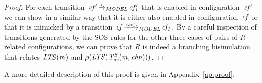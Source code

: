 \begin{proof}
For each transition~$\it{cf'} \TextModelRelation{l} \it{cf'_1}$ that is enabled in configuration~$\it{cf'}$ we can show in a similar way that it is either also enabled in configuration~$\it{cf}$ or that it is mimicked by a transition~$\it{cf} \TextModelRelation{\it{sgn()}} \it{cf_1}$.
By a careful inspection of transitions generated by the SOS rules for the other three cases of pairs of $R$-related configurations, we can prove that $R$ is indeed a branching bisimulation that relates $\it{LTS}(m)$ and $\rho(\it{LTS}(T^S_{\it{as}}(m, \it{chn})))$.
\end{proof}
A more detailed description of this proof is given in Appendix~\ref{ap:proof}. 